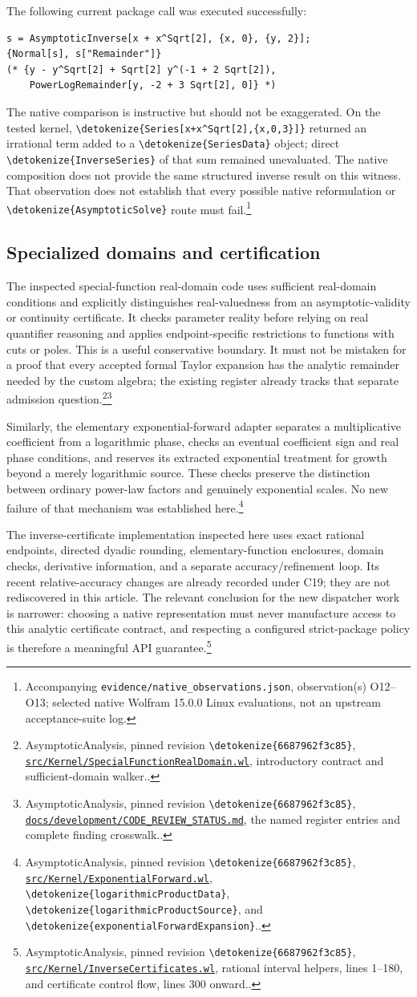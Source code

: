 \documentclass[11pt]{article}
\newcommand{\code}[1]{{\ttfamily\expandafter\nolinkurl\expandafter{\detokenize{#1}}}}
\newcommand{\repo}{https://github.com/VladimirReshetnikov/Asymptotic/blob/6687962f3c858a4f93623cfc496f33e35c6763d4/}
\newcommand{\src}[2]{\footnote{AsymptoticAnalysis, pinned revision \code{6687962f3c85}, \href{\repo#1}{\nolinkurl{#1}}, #2.}}
\newcommand{\obs}[1]{\footnote{Accompanying \nolinkurl{evidence/native_observations.json}, observation(s) #1; selected native Wolfram 15.0.0 Linux evaluations, not an upstream acceptance-suite log.}}
\newcommand{\register}{\src{docs/development/CODE_REVIEW_STATUS.md}{the named register entries and complete finding crosswalk.}}
\begin{document}
The following current package call was executed successfully:
\begin{lstlisting}
s = AsymptoticInverse[x + x^Sqrt[2], {x, 0}, {y, 2}];
{Normal[s], s["Remainder"]}
(* {y - y^Sqrt[2] + Sqrt[2] y^(-1 + 2 Sqrt[2]),
    PowerLogRemainder[y, -2 + 3 Sqrt[2], 0]} *)
\end{lstlisting}
The native comparison is instructive but should not be exaggerated. On the tested kernel,
\code{Series[x+x^Sqrt[2],{x,0,3}]} returned an irrational term added to a \code{SeriesData} object; direct \code{InverseSeries} of that sum remained unevaluated. The native composition does not provide the same structured inverse result on this witness. That observation does not establish that every possible native reformulation or \code{AsymptoticSolve} route must fail.\obs{O12--O13}

\subsection{Specialized domains and certification}
The inspected special-function real-domain code uses sufficient real-domain conditions and explicitly distinguishes real-valuedness from an asymptotic-validity or continuity certificate. It checks parameter reality before relying on real quantifier reasoning and applies endpoint-specific restrictions to functions with cuts or poles. This is a useful conservative boundary. It must not be mistaken for a proof that every accepted formal Taylor expansion has the analytic remainder needed by the custom algebra; the existing register already tracks that separate admission question.\src{src/Kernel/SpecialFunctionRealDomain.wl}{introductory contract and sufficient-domain walker.}\register

Similarly, the elementary exponential-forward adapter separates a multiplicative coefficient from a logarithmic phase, checks an eventual coefficient sign and real phase conditions, and reserves its extracted exponential treatment for growth beyond a merely logarithmic source. These checks preserve the distinction between ordinary power-law factors and genuinely exponential scales. No new failure of that mechanism was established here.\src{src/Kernel/ExponentialForward.wl}{\code{logarithmicProductData}, \code{logarithmicProductSource}, and \code{exponentialForwardExpansion}.}

The inverse-certificate implementation inspected here uses exact rational endpoints, directed dyadic rounding, elementary-function enclosures, domain checks, derivative information, and a separate accuracy/refinement loop. Its recent relative-accuracy changes are already recorded under C19; they are not rediscovered in this article. The relevant conclusion for the new dispatcher work is narrower: choosing a native representation must never manufacture access to this analytic certificate contract, and respecting a configured strict-package policy is therefore a meaningful API guarantee.\src{src/Kernel/InverseCertificates.wl}{rational interval helpers, lines 1--180, and certificate control flow, lines 300 onward.}
\end{document}
